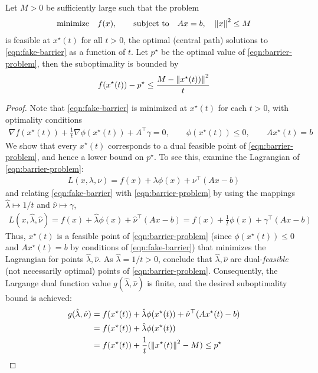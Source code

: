 \documentclass[12pt]{article}
\begin{document}
\begin{theorem}
  Let \(M > 0\) be sufficiently large such that
  the problem
  \begin{align}
    \text{minimize} \quad f(x),
      \qquad \text{subject to} \quad Ax = b, \quad {\left\lVert x\right\rVert}^2 \leq M
      \label{eqn:barrier-problem}
  \end{align}
  is feasible at \(x^\star (t)\) for all \(t > 0\),
  the optimal (central path) solutions
  to \eqref{eqn:fake-barrier} as a function of \(t\).
  Let \(p^\star\) be the optimal value of \eqref{eqn:barrier-problem},
  then the suboptimality is bounded by
  \begin{align*}
    f(x^\star (t)) - p^\star
      \leq \frac{M - {\left\lVert x^\star (t))\right\rVert}^2}{t}
  \end{align*}
\end{theorem}
\begin{proof}
  Note that \eqref{eqn:fake-barrier} is minimized at
  \(x^\star (t)\) for each \(t > 0\), with optimality conditions
  \begin{align*}
    \nabla f(x^\star (t))
        + \frac{1}{t} \nabla \phi(x^\star (t))
        + A^\top \gamma = 0,
      \qquad
      \phi(x^\star (t)) \leq 0,
      \qquad
      Ax^\star (t) = b
  \end{align*}
  We show that every \(x^\star (t)\) corresponds to
  a dual feasible point of \eqref{eqn:barrier-problem},
  and hence a lower bound on \(p^\star\).
  To see this, examine the Lagrangian of \eqref{eqn:barrier-problem}:
  \begin{align*}
    L(x, \lambda, \nu)
      = f(x) + \lambda \phi(x) + \nu^\top (Ax - b)
  \end{align*}
  and relating
  \eqref{eqn:fake-barrier} with \eqref{eqn:barrier-problem}
  by using the mappings
  \(\hat{\lambda} \mapsto 1 / t\)
  and \(\hat{\nu} \mapsto \gamma\),
  \begin{align*}
    L(x, \hat{\lambda}, \hat{\nu})
      = f(x) + \hat{\lambda} \phi(x) + \hat{\nu}^\top (Ax - b)
      = f(x) + \frac{1}{t} \phi(x) + \gamma^\top (Ax - b)
  \end{align*}
  Thus, \(x^\star (t)\)
  is a feasible point of \eqref{eqn:barrier-problem}
  (since \(\phi(x^\star (t)) \leq 0\) and \(A x^\star (t) = b\)
  by conditions of \eqref{eqn:fake-barrier})
  that minimizes the Lagrangian for points \(\hat{\lambda}, \hat{\nu}\).
  As \(\hat{\lambda} = 1/t > 0\), conclude that \(\hat{\lambda}, \hat{\nu}\)
  are dual-\textit{feasible} (not necessarily optimal) points of
  \eqref{eqn:barrier-problem}.
  Consequently, the Largange dual function value
  \(g(\hat{\lambda}, \hat{\nu})\) is finite, and
  the desired suboptimality bound is achieved:
  \begin{align*}
    g(\hat{\lambda}, \hat{\nu})
      &= f(x^\star (t))
          + \hat{\lambda} \phi(x^\star (t))
          + \hat{\nu}^\top (Ax^\star (t) - b) \\
      &= f(x^\star (t)) + \hat{\lambda} \phi(x^\star (t)) \\
      &= f(x^\star (t)) + \frac{1}{t} ({\left\lVert x^\star (t)\right\rVert}^2 - M)
      \leq p^\star
  \end{align*}
\end{proof}
\end{document}

